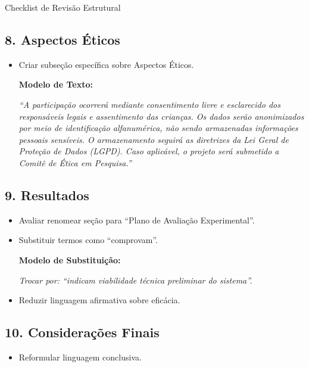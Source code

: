 \documentclass[11pt,a4paper]{article}
\begin{document}
\begin{boxAvisos}{Checklist de Revisão Estrutural}

\subsection*{8. Aspectos Éticos}

\begin{itemize}
    \item[$\Box$] Criar subseção específica sobre Aspectos Éticos.
    
    \textbf{Modelo de Texto:}
    
    \textit{``A participação ocorrerá mediante consentimento livre e esclarecido dos responsáveis legais e assentimento das crianças. Os dados serão anonimizados por meio de identificação alfanumérica, não sendo armazenadas informações pessoais sensíveis. O armazenamento seguirá as diretrizes da Lei Geral de Proteção de Dados (LGPD). Caso aplicável, o projeto será submetido a Comitê de Ética em Pesquisa.''}
\end{itemize}


\subsection*{9. Resultados}

\begin{itemize}
    \item[$\boxtimes$] Avaliar renomear seção para ``Plano de Avaliação Experimental''.
    
    \item[$\boxtimes$] Substituir termos como ``comprovam''.
    
    \textbf{Modelo de Substituição:}
    
    \textit{Trocar por: ``indicam viabilidade técnica preliminar do sistema''.}

    \item[$\boxtimes$] Reduzir linguagem afirmativa sobre eficácia.
\end{itemize}


\subsection*{10. Considerações Finais}

\begin{itemize}
    \item[$\boxtimes$] Reformular linguagem conclusiva.
    

\end{itemize}
\end{boxAvisos}
\end{document}
